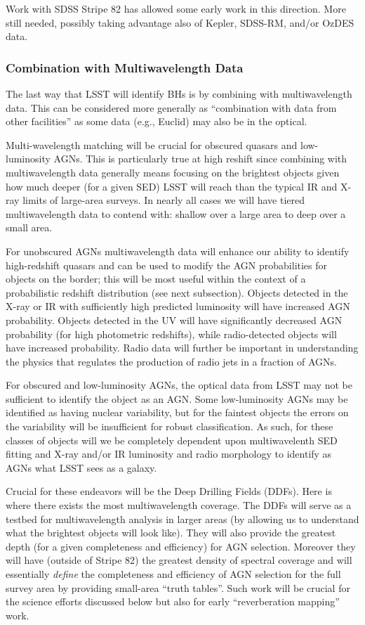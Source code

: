 Work with SDSS Stripe 82 has allowed some early work in this
direction.  More still needed, possibly taking advantage also of
Kepler, SDSS-RM, and/or OzDES data.


\subsubsection{Combination with Multiwavelength Data}

The last way that LSST will identify BHs is by combining with multiwavelength data.  This can be considered more generally as ``combination with data from other facilities'' as some data (e.g., Euclid) may also be in the optical.

Multi-wavelength matching will be crucial for obscured quasars and low-luminosity AGNs.  This is particularly true at high reshift since combining with multiwavelength data generally means focusing on the brightest objects given how much deeper (for a given SED) LSST will reach than the typical IR and X-ray limits of large-area surveys.  In nearly all cases we will have tiered multiwavelength data to contend with: shallow over a large area to deep over a small area.

For unobscured AGNs multiwavelength data will enhance our ability to identify high-redshift quasars and can be used to modify the AGN probabilities for objects on the border; this will be most useful within the context of a probabilistic redshift distribution (see next subsection).  Objects detected in the X-ray or IR with sufficiently high predicted luminosity will have increased AGN probability.  Objects detected in the UV will have significantly decreased AGN probability (for high photometric redshifts), while radio-detected objects will have increased probability.   Radio data will further be important in understanding the physics that regulates the production of radio jets in a fraction of AGNs.

For obscured and low-luminosity AGNs, the optical data from LSST may not be sufficient to identify the object as an AGN.  Some low-luminosity AGNs may be identified as having nuclear variability, but for the faintest objects the errors on the variability will be insufficient for robust classification.  As such, for these classes of objects will we be completely dependent upon multiwavelenth SED fitting and X-ray and/or IR luminosity and radio morphology to identify as AGNs what LSST sees as a galaxy.

Crucial for these endeavors will be the Deep Drilling Fields (DDFs).  Here is where there exists the most multiwavelength coverage.  The DDFs will serve as a testbed for multiwavelength analysis in larger areas (by allowing us to understand what the brightest objects will look like).  They will also provide the greatest depth (for a given completeness and efficiency) for AGN selection.  Moreover they will have (outside of Stripe 82) the greatest density of spectral coverage and will essentially {\em define} the completeness and efficiency of AGN selection for the full survey area by providing small-area ``truth tables''.  Such work will be crucial for the science efforts discussed below but also for early ``reverberation mapping'' work.

